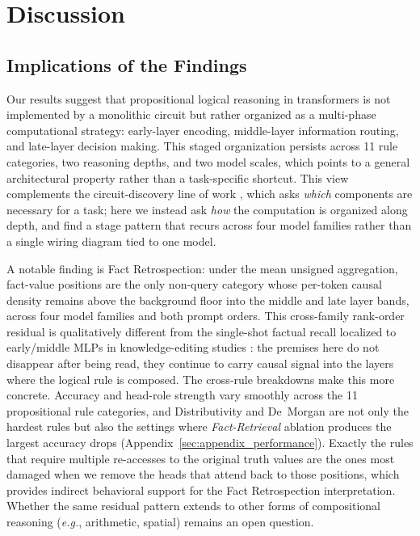 \documentclass[11pt]{article}
\begin{document}
\section{Discussion}
\subsection{Implications of the Findings}

Our results suggest that propositional logical reasoning in transformers is not implemented by a monolithic circuit but rather organized as a multi-phase computational strategy: early-layer encoding, middle-layer information routing, and late-layer decision making. This staged organization persists across 11 rule categories, two reasoning depths, and two model scales, which points to a general architectural property rather than a task-specific shortcut. This view complements the circuit-discovery line of work \citep{elhage2021mathematicalframeworktransformer, wang2022interpretabilitywildcircuitindirect}, which asks \textit{which} components are necessary for a task; here we instead ask \textit{how} the computation is organized along depth, and find a stage pattern that recurs across four model families rather than a single wiring diagram tied to one model.

A notable finding is Fact Retrospection: under the mean unsigned aggregation, fact-value positions are the only non-query category whose per-token causal density remains above the background floor into the middle and late layer bands, across four model families and both prompt orders. This cross-family rank-order residual is qualitatively different from the single-shot factual recall localized to early/middle MLPs in knowledge-editing studies \citep{meng2023locatingeditingfactualassociations}: the premises here do not disappear after being read, they continue to carry causal signal into the layers where the logical rule is composed. The cross-rule breakdowns make this more concrete. Accuracy and head-role strength vary smoothly across the 11 propositional rule categories, and Distributivity and De~Morgan are not only the hardest rules but also the settings where \textit{Fact-Retrieval} ablation produces the largest accuracy drops (Appendix~\ref{sec:appendix_performance}). Exactly the rules that require multiple re-accesses to the original truth values are the ones most damaged when we remove the heads that attend back to those positions, which provides indirect behavioral support for the Fact Retrospection interpretation. Whether the same residual pattern extends to other forms of compositional reasoning (\textit{e.g.}, arithmetic, spatial) remains an open question.
\end{document}
